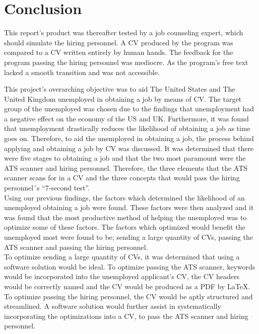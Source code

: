 \section{Conclusion}\label{sec:conclusion}
This report’s product was thereafter tested by a job counseling expert, which should simulate the hiring personnel. 
A CV produced by the program was compared to a CV written entirely by human hands. 
The feedback for the program passing the hiring personnel was mediocre. 
As the program’s free text lacked a smooth transition and was not accessible.

This project’s overarching objective was to aid The United States and The United Kingdom unemployed in obtaining a job by means of CV. 
The target group of the unemployed was chosen due to the findings that unemployment had a negative effect on the economy of the US and UK.
Furthermore, it was found that unemployment drastically reduces the likelihood of obtaining a job as time goes on.
Therefore, to aid the unemployed in obtaining a job, the process behind applying and obtaining a job by CV was discussed. 
It was determined that there were five stages to obtaining a job and that the two most paramount were the ATS scanner and hiring personnel.
Therefore, the three elements that the ATS scanner scans for in a CV and the three concepts that would pass the hiring personnel´s “7-second test”. \\

Using our previous findings, the factors which determined the likelihood of an unemployed obtaining a job were found. 
These factors were then analyzed and it was found that the most productive method of helping the unemployed was to optimize some of these factors.
The factors which optimized would benefit the unemployed most were found to be; sending a large quantity of CVs, passing the ATS scanner and passing the hiring personnel. \\

To optimize sending a large quantity of CVs, it was determined that using a software solution would be ideal. 
To optimize passing the ATS scanner, keywords would be incorporated into the unemployed applicant’s CV, the CV headers would be correctly named and the CV would be produced as a PDF by LaTeX. 
To optimize passing the hiring personnel, the CV would be aptly structured and streamlined. 
A software solution would further assist in systematically incorporating the optimizations into a CV, to pass the ATS scanner and hiring personnel. \\

